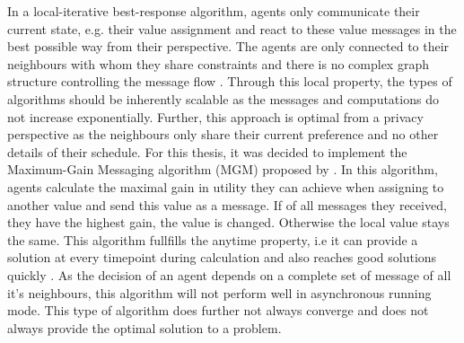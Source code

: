 In a local-iterative best-response algorithm, agents only communicate their current state, e.g. their value assignment and react to these value messages in the best possible way from their perspective. The agents are only connected to their neighbours with whom they share constraints and there is no complex graph structure controlling the message flow \cite{Chapman2011}. Through this local property, the types of algorithms should be inherently scalable as the messages and computations do not increase exponentially. Further, this approach is optimal from a privacy perspective as the neighbours only share their current preference and no other details of their schedule. %
\newline\newline
For this thesis, it was decided to implement the Maximum-Gain Messaging algorithm (MGM) proposed by \cite{Yokoo1996}. In this algorithm, agents  calculate the maximal gain in utility they can achieve when assigning to another value and send this value as a message. If of all messages they received, they have the highest gain, the value is changed. Otherwise the local value stays the same. This algorithm fullfills the anytime property, i.e it can provide a solution at every timepoint during calculation and also reaches good solutions quickly \cite{Chapman2010}. As the decision of an agent depends on a complete set of message of all it's neighbours, this algorithm will not perform well in asynchronous running mode. This type of algorithm does further not always converge and does not always provide the optimal solution to a problem.

